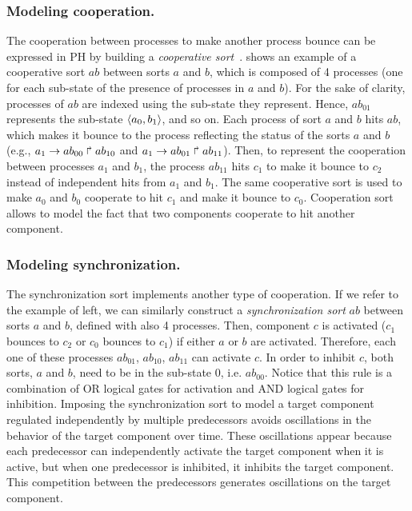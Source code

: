 \subsubsection{Modeling cooperation.}

The cooperation between processes to make another process bounce can be
expressed in PH by building a \emph{cooperative sort}~\cite{PMR10-TCSB}.
 shows an example of a cooperative sort $ab$ between sorts $a$ and $b$,
which is composed of 4 processes (one for each sub-state of the presence of processes in $a$ and $b$).
For the sake of clarity, processes of $ab$ are indexed using the sub-state they represent.
Hence, $ab_{01}$ represents the sub-state $\langle a_0,b_1 \rangle$, and so on.
Each process of sort $a$ and $b$ hits $ab$, which makes it bounce to the process reflecting the status of the sorts $a$
and $b$ (e.g., $a_1\rightarrow ab_{00}\Rsh ab_{10}$ and $a_1\rightarrow ab_{01}\Rsh ab_{11}$).
Then, to represent the cooperation between processes $a_1$ and $b_1$,
the process $ab_{11}$ hits $c_1$ to make it bounce to $c_2$ instead of
independent hits from $a_1$ and $b_1$.
The same cooperative sort is used to make $a_0$ and $b_0$ cooperate to hit $c_1$ and make it bounce to $c_0$.
Cooperation sort allows to model the fact that two components cooperate to hit another component.

\subsubsection{Modeling synchronization.}
\label{sssec:synchronization}

The synchronization sort implements another type of cooperation. If we refer to the example of
 left, we can similarly construct a \emph{synchronization sort} $ab$ between sorts $a$ and $b$, defined with also 
4 processes. Then, component $c$ is activated ($c_1$ bounces to $c_2$ or $c_0$ bounces to $c_1$) if either  $a$ or $b$ are activated. Therefore, each one of 
these processes $ab_{01}$, $ab_{10}$, $ab_{11}$ can activate $c$.  In order to inhibit $c$, both sorts, $a$ and $b$, need to be 
in the sub-state $0$, i.e. $ab_{00}$. Notice that this rule is a combination of OR logical gates for activation and AND logical gates for inhibition.
Imposing the synchronization sort to model a target component regulated independently by multiple predecessors avoids oscillations in the behavior of the target component over time. 
These oscillations appear because each predecessor can independently activate the target component when it is active,
but when one predecessor is inhibited, it inhibits the target component. This competition between the predecessors
generates oscillations on the target component.  



